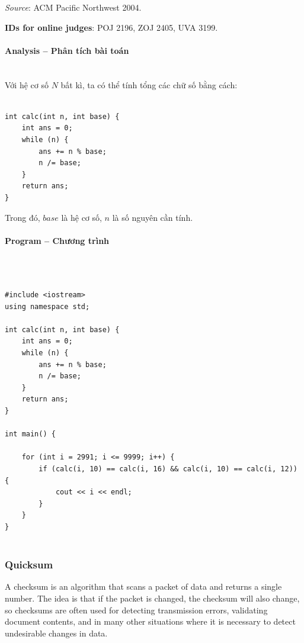 \documentclass{article}
\begin{document}
\textit{Source}: ACM Pacific Northwest 2004.

\textbf{IDs for online judges}: POJ 2196, ZOJ 2405, UVA
3199.


\paragraph{Analysis -- Phân tích bài toán} \mbox{} \\

Với hệ cơ số $N$ bất kì, ta có thể tính tổng các chữ số bằng cách: \\

\begin{lstlisting}

int calc(int n, int base) {
	int ans = 0;
	while (n) {
		ans += n % base;
		n /= base;
	}
	return ans;
}

\end{lstlisting}

Trong đó, $base$ là hệ cơ số, $n$ là số nguyên cần tính.


\paragraph{Program -- Chương trình} \mbox{} \\


\begin{lstlisting}

#include <iostream>
using namespace std;

int calc(int n, int base) {
	int ans = 0;
	while (n) {
		ans += n % base;
		n /= base;
	}
	return ans;
}

int main() {

	for (int i = 2991; i <= 9999; i++) {
		if (calc(i, 10) == calc(i, 16) && calc(i, 10) == calc(i, 12)) {
			cout << i << endl;
		}
	}
}


\end{lstlisting}


\subsubsection{Quicksum}

A checksum is an algorithm that scans a packet of data and returns a single number. The idea
is that if the packet is changed, the checksum will also change, so checksums are often used for
detecting transmission errors, validating document contents, and in many other situations where it is necessary to detect undesirable changes in data. \\
\end{document}
